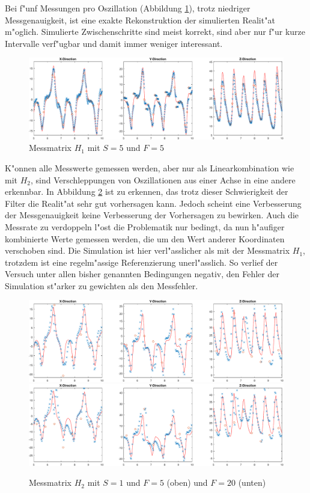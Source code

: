 \begin{refsection}
Bei f"unf Messungen pro Oszillation (Abbildung \ref{kalman:H1S5}), trotz niedriger Messgenauigkeit, ist eine exakte Rekonstruktion der simulierten Realit"at m"oglich. Simulierte Zwischenschritte sind meist korrekt, sind aber nur f"ur kurze Intervalle verf"ugbar und damit immer weniger interessant.
\begin{figure}
\centering
\includegraphics[width=\hsize]{kalman/figures/H1R05S5.pdf}
\caption{Messmatrix $H_{1}$ mit $S=5$ und $F=5$}
\label{kalman:H1S5}
\end{figure}

K"onnen alle Messwerte gemessen werden, aber nur als Linearkombination wie mit $H_{2}$, sind Verschleppungen von Oszillationen aus einer Achse in eine andere erkennbar. In Abbildung \ref{kalman:H2S1} ist zu erkennen, das trotz dieser Schwierigkeit der Filter die Realit"at sehr gut vorhersagen kann. Jedoch scheint eine Verbesserung der Messgenauigkeit keine Verbesserung der Vorhersagen zu bewirken.
Auch die Messrate zu verdoppeln l"ost die Problematik nur bedingt, da nun h"aufiger kombinierte Werte gemessen werden, die um den Wert anderer Koordinaten verschoben sind. Die Simulation ist hier verl"asslicher als mit der Messmatrix $H_{1}$, trotzdem ist eine regelm"assige Referenzierung unerl"asslich. So verlief der Versuch unter allen bisher genannten Bedingungen negativ, den Fehler der Simulation st"arker zu gewichten als den Messfehler.

\begin{figure}
\centering
\includegraphics[width=\hsize]{kalman/figures/H2R05S1.pdf}
\includegraphics[width=\hsize]{kalman/figures/H2R20S1.pdf}
\caption{Messmatrix $H_{2}$ mit $S=1$ und $F=5$ (oben) und $F=20$ (unten)}
\label{kalman:H2S1}
\end{figure}


\end{refsection}
